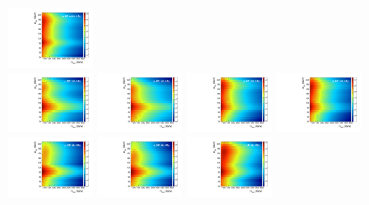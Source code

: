 \begin{figure}[htbp]
  \includegraphics[width=0.2\textwidth]{fig/2Dfit/template_res_e_LP_nobb_LDy.pdf}\\
  \includegraphics[width=0.2\textwidth]{fig/2Dfit/template_res_mu_HP_vbf_LDy.pdf}
  \includegraphics[width=0.2\textwidth]{fig/2Dfit/template_res_e_HP_vbf_LDy.pdf}
  \includegraphics[width=0.2\textwidth]{fig/2Dfit/template_res_mu_LP_vbf_LDy.pdf}
  \includegraphics[width=0.2\textwidth]{fig/2Dfit/template_res_e_LP_vbf_LDy.pdf}\\
  \includegraphics[width=0.2\textwidth]{fig/2Dfit/template_res_mu_HP_bb_HDy.pdf}
  \includegraphics[width=0.2\textwidth]{fig/2Dfit/template_res_e_HP_bb_HDy.pdf}
  \includegraphics[width=0.2\textwidth]{fig/2Dfit/template_res_mu_LP_bb_HDy.pdf}

\end{figure}
